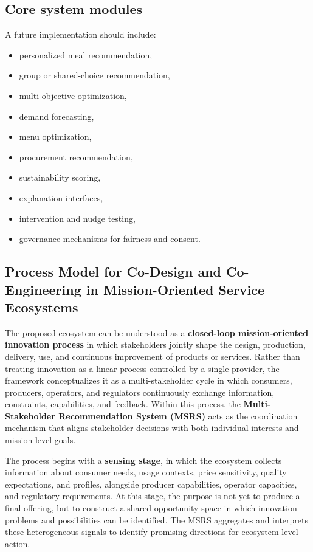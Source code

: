 \documentclass[
  letterpaper,
  DIV=11,
  numbers=noendperiod]{scrartcl}
\providecommand{\tightlist}{%
  \setlength{\itemsep}{0pt}\setlength{\parskip}{0pt}}
\begin{document}
\subsection{Core system modules}\label{core-system-modules}

A future implementation should include:

\begin{itemize}
\tightlist
\item
  personalized meal recommendation,
\item
  group or shared-choice recommendation,
\item
  multi-objective optimization,
\item
  demand forecasting,
\item
  menu optimization,
\item
  procurement recommendation,
\item
  sustainability scoring,
\item
  explanation interfaces,
\item
  intervention and nudge testing,
\item
  governance mechanisms for fairness and consent.
\end{itemize}

\subsection{Process Model for Co-Design and Co-Engineering in
Mission-Oriented Service
Ecosystems}\label{process-model-for-co-design-and-co-engineering-in-mission-oriented-service-ecosystems}

The proposed ecosystem can be understood as a \textbf{closed-loop
mission-oriented innovation process} in which stakeholders jointly shape
the design, production, delivery, use, and continuous improvement of
products or services. Rather than treating innovation as a linear
process controlled by a single provider, the framework conceptualizes it
as a multi-stakeholder cycle in which consumers, producers, operators,
and regulators continuously exchange information, constraints,
capabilities, and feedback. Within this process, the
\textbf{Multi-Stakeholder Recommendation System (MSRS)} acts as the
coordination mechanism that aligns stakeholder decisions with both
individual interests and mission-level goals.

The process begins with a \textbf{sensing stage}, in which the ecosystem
collects information about consumer needs, usage contexts, price
sensitivity, quality expectations, and profiles, alongside producer
capabilities, operator capacities, and regulatory requirements. At this
stage, the purpose is not yet to produce a final offering, but to
construct a shared opportunity space in which innovation problems and
possibilities can be identified. The MSRS aggregates and interprets
these heterogeneous signals to identify promising directions for
ecosystem-level action.
\end{document}
